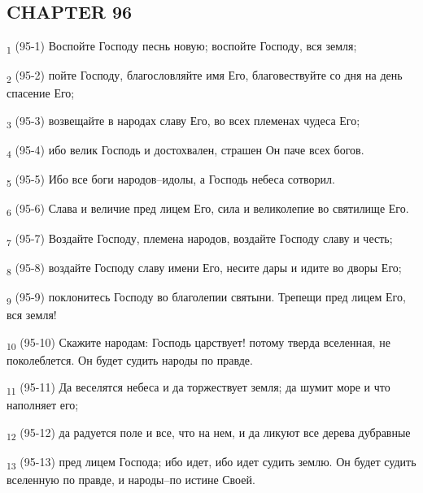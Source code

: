 \subsection{CHAPTER 96}
\begin{tcolorbox}
\textsubscript{1} (95-1) Воспойте Господу песнь новую; воспойте Господу, вся земля;
\end{tcolorbox}
\begin{tcolorbox}
\textsubscript{2} (95-2) пойте Господу, благословляйте имя Его, благовествуйте со дня на день спасение Его;
\end{tcolorbox}
\begin{tcolorbox}
\textsubscript{3} (95-3) возвещайте в народах славу Его, во всех племенах чудеса Его;
\end{tcolorbox}
\begin{tcolorbox}
\textsubscript{4} (95-4) ибо велик Господь и достохвален, страшен Он паче всех богов.
\end{tcolorbox}
\begin{tcolorbox}
\textsubscript{5} (95-5) Ибо все боги народов--идолы, а Господь небеса сотворил.
\end{tcolorbox}
\begin{tcolorbox}
\textsubscript{6} (95-6) Слава и величие пред лицем Его, сила и великолепие во святилище Его.
\end{tcolorbox}
\begin{tcolorbox}
\textsubscript{7} (95-7) Воздайте Господу, племена народов, воздайте Господу славу и честь;
\end{tcolorbox}
\begin{tcolorbox}
\textsubscript{8} (95-8) воздайте Господу славу имени Его, несите дары и идите во дворы Его;
\end{tcolorbox}
\begin{tcolorbox}
\textsubscript{9} (95-9) поклонитесь Господу во благолепии святыни. Трепещи пред лицем Его, вся земля!
\end{tcolorbox}
\begin{tcolorbox}
\textsubscript{10} (95-10) Скажите народам: Господь царствует! потому тверда вселенная, не поколеблется. Он будет судить народы по правде.
\end{tcolorbox}
\begin{tcolorbox}
\textsubscript{11} (95-11) Да веселятся небеса и да торжествует земля; да шумит море и что наполняет его;
\end{tcolorbox}
\begin{tcolorbox}
\textsubscript{12} (95-12) да радуется поле и все, что на нем, и да ликуют все дерева дубравные
\end{tcolorbox}
\begin{tcolorbox}
\textsubscript{13} (95-13) пред лицем Господа; ибо идет, ибо идет судить землю. Он будет судить вселенную по правде, и народы--по истине Своей.
\end{tcolorbox}
